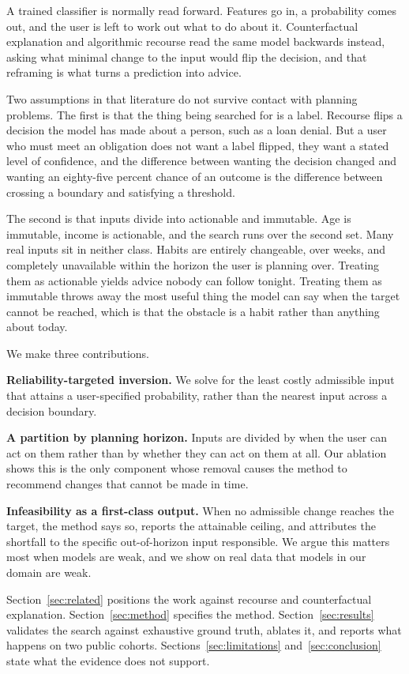 \documentclass[conference,letterpaper]{IEEEtran}
\begin{document}
A trained classifier is normally read forward. Features go in, a probability
comes out, and the user is left to work out what to do about it. Counterfactual
explanation and algorithmic recourse read the same model backwards instead,
asking what minimal change to the input would flip the decision, and that
reframing is what turns a prediction into advice.

Two assumptions in that literature do not survive contact with planning
problems. The first is that the thing being searched for is a label. Recourse
flips a decision the model has made about a person, such as a loan denial. But a
user who must meet an obligation does not want a label flipped, they want a
stated level of confidence, and the difference between wanting the decision
changed and wanting an eighty-five percent chance of an outcome is the
difference between crossing a boundary and satisfying a threshold.

The second is that inputs divide into actionable and immutable. Age is
immutable, income is actionable, and the search runs over the second set. Many
real inputs sit in neither class. Habits are entirely changeable, over weeks,
and completely unavailable within the horizon the user is planning over.
Treating them as actionable yields advice nobody can follow tonight. Treating
them as immutable throws away the most useful thing the model can say when the
target cannot be reached, which is that the obstacle is a habit rather than
anything about today.

We make three contributions.

\textbf{Reliability-targeted inversion.} We solve for the least costly
admissible input that attains a user-specified probability, rather than the
nearest input across a decision boundary.

\textbf{A partition by planning horizon.} Inputs are divided by when the user
can act on them rather than by whether they can act on them at all. Our ablation
shows this is the only component whose removal causes the method to recommend
changes that cannot be made in time.

\textbf{Infeasibility as a first-class output.} When no admissible change
reaches the target, the method says so, reports the attainable ceiling, and
attributes the shortfall to the specific out-of-horizon input responsible. We
argue this matters most when models are weak, and we show on real data that
models in our domain are weak.

Section~\ref{sec:related} positions the work against recourse and counterfactual
explanation. Section~\ref{sec:method} specifies the method.
Section~\ref{sec:results} validates the search against exhaustive ground truth,
ablates it, and reports what happens on two public cohorts.
Sections~\ref{sec:limitations} and~\ref{sec:conclusion} state what the evidence
does not support.
\end{document}
